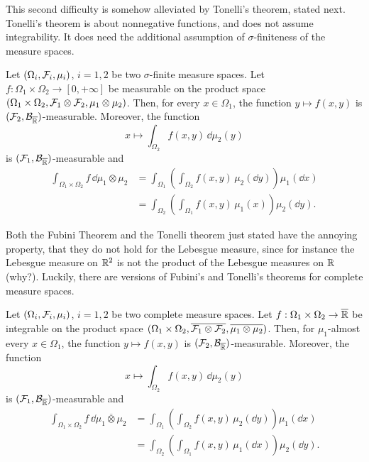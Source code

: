 This second difficulty is somehow alleviated by Tonelli's theorem, stated next. Tonelli's theorem is about nonnegative functions, and does not assume integrability. It does need the additional assumption of $\sigma$-finiteness of the measure spaces.

\begin{theorem}
	Let $(\Omega_i, \mathcal F_i, \mu_i)$, $i=1,2$ be two $\sigma$-finite measure spaces. 
	Let $f : \Omega_1 \times \Omega_2 \to [0,+\infty]$ be measurable on the product space $(\Omega_1 \times \Omega_2, \mathcal F_1 \otimes \mathcal F_2, \mu_1 \otimes \mu_2)$. Then, for every $x \in \Omega_1$, the function $y \mapsto f(x, y)$ is $(\mathcal F_2,\mathcal B_{\overline{\mathbb R}})$-measurable. Moreover, the function 
	\[
	x \mapsto \int_{\Omega_2} f(x,y)\, \dd \mu_2(y)
	\]
	is $(\mathcal F_1,\mathcal B_{\overline{\mathbb R}})$-measurable and
	\[
	\begin{split}
	\int_{\Omega_1 \times \Omega_2} f\, \dd \mu_1 \otimes \mu_2 
	&= \int_{\Omega_1} \left( \int_{\Omega_2 } f(x,  y ) \,\mu_2(\dd y) \right) \mu_1(\dd x)\\
	&= \int_{\Omega_2} \left( \int_{\Omega_1} f(x, y)  \,\mu_1(x) \right) \mu_2(\dd y).
	\end{split}
	\] 
\end{theorem}

Both the Fubini Theorem and the Tonelli theorem just stated have the annoying property, that they do not hold for the Lebesgue measure, since for instance the Lebesgue measure on $\mathbb R^2$ is not the product of the Lebesgue measures on $\mathbb R$ (why?). Luckily, there are versions of Fubini's and Tonelli's theorems for complete measure spaces.

\begin{theorem}
Let $(\Omega_i, \mathcal F_i, \mu_i)$, $i=1,2$ be two complete measure spaces. 
Let $f : \Omega_1 \times \Omega_2 \to \overline{\mathbb R}$ be integrable on the product space $(\Omega_1 \times \Omega_2, \overline{\mathcal F_1 \otimes \mathcal F_2}, \overline{\mu_1 \otimes \mu_2})$. Then, for $\mu_1$-almost every $x \in \Omega_1$, the function $y \mapsto f(x, y)$ is $(\mathcal F_2,\mathcal B_{\overline{\mathbb R}})$-measurable. Moreover, the function 
\[
x \mapsto \int_{\Omega_2} f(x,y)\, \dd \mu_2(y)
\]
is $(\mathcal F_1,\mathcal B_{\overline{\mathbb R}})$-measurable and
\[
\begin{split}
\int_{\Omega_1 \times \Omega_2} f\, \dd \overline{\mu_1 \otimes \mu_2} 
&= \int_{\Omega_1} \left( \int_{\Omega_2 } f(x,  y ) \,\mu_2(\dd y) \right) \mu_1(\dd x)\\
&= \int_{\Omega_2} \left( \int_{\Omega_1} f(x, y) \,\mu_1(\dd x) \right) \mu_2(\dd y).
\end{split}
\] 	
\end{theorem}

